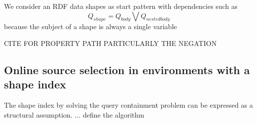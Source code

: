 We consider an RDF data shapes as start pattern with dependencies such as 
\begin{equation}
   Q_{shape} = Q_{body} \bigvee Q_{nested body}
\end{equation}
because the subject of a shape is always a single variable 

CITE FOR PROPERTY PATH PARTICULARLY THE NEGATION \cite{Kostylev2015}



\subsection{Online source selection in environments with a shape index}

The shape index by solving the query containment problem can be expressed as a structural assumption.
... define the algorithm